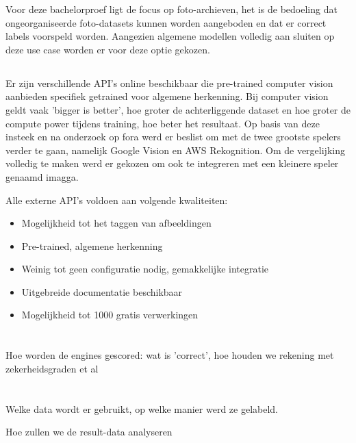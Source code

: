 Voor deze bachelorproef ligt de focus op foto-archieven, het is de bedoeling dat ongeorganiseerde foto-datasets kunnen worden aangeboden en dat er correct labels voorspeld worden. Aangezien algemene modellen volledig aan sluiten op deze use case worden er voor deze optie gekozen.

\subsection{}
\label{sec:keuze-externe-API}
Er zijn verschillende API's online beschikbaar die pre-trained computer vision aanbieden specifiek getrained voor algemene herkenning. Bij computer vision geldt vaak 'bigger is better', hoe groter de achterliggende dataset en hoe groter de compute power tijdens training, hoe beter het resultaat. Op basis van deze insteek en na onderzoek op fora werd er beslist om met de twee grootste spelers verder te gaan, namelijk Google Vision en AWS Rekognition. Om de vergelijking volledig te maken werd er gekozen om ook te integreren met een kleinere speler genaamd imagga.

Alle externe API's voldoen aan volgende kwaliteiten:
 \begin{itemize}
     \item Mogelijkheid tot het taggen van afbeeldingen
     \item Pre-trained, algemene herkenning
     \item Weinig tot geen configuratie nodig, gemakkelijke integratie
     \item Uitgebreide documentatie beschikbaar
     \item Mogelijkheid tot 1000 gratis verwerkingen
 \end{itemize}

\section{}
\label{sec:integratie-met-computer-vision}

\section{}
\label{sec:scoren-van-computer-vision}
Hoe worden de engines gescored: wat is 'correct', hoe houden we rekening met zekerheidsgraden et al

\section{}
\label{sec:methodologie-data}
Welke data wordt er gebruikt, op welke manier werd ze gelabeld.

Hoe zullen we de result-data analyseren